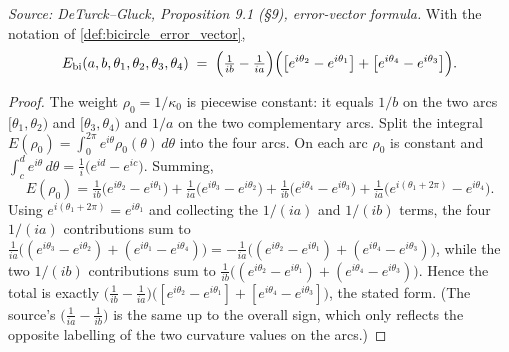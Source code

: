 \begin{lemma}

  \label{lem:error_vector_of_bicircle}
  \textit{Source: DeTurck--Gluck, Proposition 9.1 (§9), error-vector formula.}
  With the notation of \cref{def:bicircle_error_vector},
  \[
    E_{\mathrm{bi}}(a,b,\theta_1,\theta_2,\theta_3,\theta_4)
      \;=\; \Bigl(\tfrac{1}{ib} - \tfrac{1}{ia}\Bigr)
            \Bigl(\bigl[e^{i\theta_2} - e^{i\theta_1}\bigr]
                + \bigl[e^{i\theta_4} - e^{i\theta_3}\bigr]\Bigr).
  \]
\end{lemma}
\begin{proof}
  \leanok
  The weight $\rho_0 = 1/\kappa_0$ is piecewise constant: it equals $1/b$ on the
  two arcs $[\theta_1,\theta_2)$ and $[\theta_3,\theta_4)$ and $1/a$ on the two
  complementary arcs. Split the integral $E(\rho_0) = \int_0^{2\pi}
  e^{i\theta}\rho_0(\theta)\,d\theta$ into the four arcs. On each arc $\rho_0$ is
  constant and $\int_{c}^{d} e^{i\theta}\,d\theta = \frac{1}{i}\bigl(e^{id} -
  e^{ic}\bigr)$. Summing,
  \[
    E(\rho_0)
      = \tfrac{1}{ib}\bigl(e^{i\theta_2}-e^{i\theta_1}\bigr)
      + \tfrac{1}{ia}\bigl(e^{i\theta_3}-e^{i\theta_2}\bigr)
      + \tfrac{1}{ib}\bigl(e^{i\theta_4}-e^{i\theta_3}\bigr)
      + \tfrac{1}{ia}\bigl(e^{i(\theta_1+2\pi)}-e^{i\theta_4}\bigr).
  \]
  Using $e^{i(\theta_1+2\pi)} = e^{i\theta_1}$ and collecting the $1/(ia)$ and
  $1/(ib)$ terms, the four $1/(ia)$ contributions sum to
  $\tfrac{1}{ia}\bigl((e^{i\theta_3}-e^{i\theta_2}) +
  (e^{i\theta_1}-e^{i\theta_4})\bigr) = -\tfrac{1}{ia}\bigl((e^{i\theta_2} -
  e^{i\theta_1}) + (e^{i\theta_4} - e^{i\theta_3})\bigr)$, while the two $1/(ib)$
  contributions sum to $\tfrac{1}{ib}\bigl((e^{i\theta_2} - e^{i\theta_1}) +
  (e^{i\theta_4} - e^{i\theta_3})\bigr)$. Hence the total is exactly
  $\bigl(\tfrac{1}{ib} - \tfrac{1}{ia}\bigr)\bigl([e^{i\theta_2} - e^{i\theta_1}]
  + [e^{i\theta_4} - e^{i\theta_3}]\bigr)$, the stated form. (The source's
  $\bigl(\tfrac{1}{ia} - \tfrac{1}{ib}\bigr)$ is the same up to the overall sign,
  which only reflects the opposite labelling of the two curvature values on the
  arcs.)
\end{proof}


